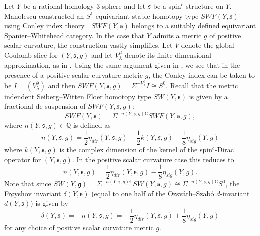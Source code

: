 \documentclass{amsart}
\theoremstyle{definition}
\theoremstyle{remark}
\numberwithin{equation}{section}
\begin{document}
Let $Y$ be a rational homology $3$-sphere and let $\mathfrak{s}$ be a spin$^c$-structure on $Y$. Manolescu constructed an $S^1$-equivariant stable homotopy type $SWF(Y,\mathfrak{s})$ using Conley index theory \cite{man1}. $SWF(Y , \mathfrak{s})$ belongs to a suitably defined equivariant Spanier--Whitehead category. In the case that $Y$ admits a metric $g$ of positive scalar curvature, the construction vastly simplifies. Let $V$ denote the global Coulomb slice \cite[]{man1} for $(Y,\mathfrak{s},g)$ and let $V^\mu_\lambda$ denote its finite-dimensional approximation, as in \cite[]{man1}. Using the same argument given in \cite[]{man1}, we see that in the presence of a positive scalar curvature metric $g$, the Conley index can be taken to be $I = (V^0_\lambda)$ and then $SWF(Y,\mathfrak{s},g) = \Sigma^{-V^0_\lambda} I \cong S^0$. Recall that the metric indendent Seiberg--Witten Floer homotopy type $SW(Y,\mathfrak{s})$ is given by a fractional de-suspension of $SWF(Y , \mathfrak{s} , g)$:
\[
SWF(Y , \mathfrak{s}) = \Sigma^{-n(Y,\mathfrak{s},g)\mathbb{C}} SWF(Y , \mathfrak{s} , g ),
\]
where $n(Y , \mathfrak{s},g) \in \mathbb{Q}$ is defined as
\[
n(Y , \mathfrak{s},g) = \frac{1}{2}\eta_{dir}(Y , \mathfrak{s},g) - \frac{1}{2}k(Y,\mathfrak{s},g) - \frac{1}{8}\eta_{sig}(Y,g)
\]
where $k(Y , \mathfrak{s},g)$ is the complex dimension of the kernel of the spin$^c$-Dirac operator for $(Y,\mathfrak{s},g)$. In the positive scalar curvature case this reduces to
\[
n(Y , \mathfrak{s},g) = \frac{1}{2}\eta_{dir}(Y , \mathfrak{s},g) - \frac{1}{8}\eta_{sig}(Y,g).
\]
Note that since $SW(Y , \mathfrak{g}) = \Sigma^{-n(Y,\mathfrak{s},g)\mathbb{C}} SW(Y , \mathfrak{s} , g ) \cong \Sigma^{-n(Y,\mathfrak{s},g)\mathbb{C}} S^0$, the Fr\o yshov invariant $\delta(Y , \mathfrak{s})$ (equal to one half of the Ozsv\'ath--Szab\'o $d$-invariant $d(Y,\mathfrak{s})$) is given by
\[
\delta(Y, \mathfrak{s}) = -n(Y , \mathfrak{s} , g ) =  -\frac{1}{2}\eta_{dir}(Y , \mathfrak{s},g) + \frac{1}{8}\eta_{sig}(Y,g)
\]
for any choice of positive scalar curvature metric $g$.
\end{document}
